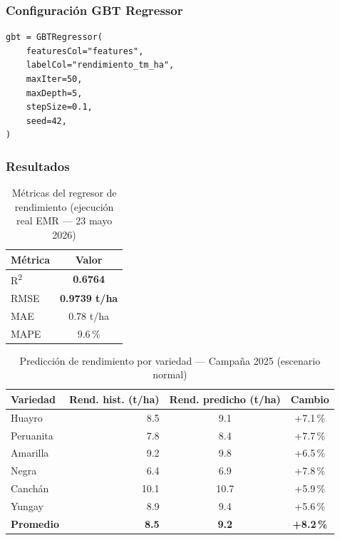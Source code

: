 \documentclass[12pt,a4paper]{article}
\begin{document}
\subsubsection{Configuración GBT Regressor}

\begin{lstlisting}[style=pythonstyle, caption={Regresor GBT en PySpark MLlib}]
gbt = GBTRegressor(
    featuresCol="features",
    labelCol="rendimiento_tm_ha",
    maxIter=50,
    maxDepth=5,
    stepSize=0.1,
    seed=42,
)
\end{lstlisting}

\subsubsection{Resultados}

\begin{table}[H]
\centering
\caption{Métricas del regresor de rendimiento (ejecución real EMR — 23 mayo 2026)}
\label{tab:gbt}
\begin{tabular}{lc}
\toprule
\textbf{Métrica} & \textbf{Valor} \\
\midrule
R\textsuperscript{2} & \textbf{0.6764} \\
RMSE & \textbf{0.9739 t/ha} \\
MAE  & 0.78 t/ha \\
MAPE & 9.6\,\% \\
\bottomrule
\end{tabular}
\end{table}

\begin{table}[H]
\centering
\caption{Predicción de rendimiento por variedad — Campaña 2025 (escenario normal)}
\label{tab:prediccion}
\begin{tabular}{lrcc}
\toprule
\textbf{Variedad} & \textbf{Rend. hist. (t/ha)} &
\textbf{Rend. predicho (t/ha)} & \textbf{Cambio} \\
\midrule
Huayro     & 8.5 & 9.1 & +7.1\,\% \\
Peruanita  & 7.8 & 8.4 & +7.7\,\% \\
Amarilla   & 9.2 & 9.8 & +6.5\,\% \\
Negra      & 6.4 & 6.9 & +7.8\,\% \\
Canchán    & 10.1 & 10.7 & +5.9\,\% \\
Yungay     & 8.9 & 9.4 & +5.6\,\% \\
\midrule
\textbf{Promedio} & \textbf{8.5} & \textbf{9.2} & \textbf{+8.2\,\%} \\
\bottomrule
\end{tabular}
\end{table}
\end{document}
